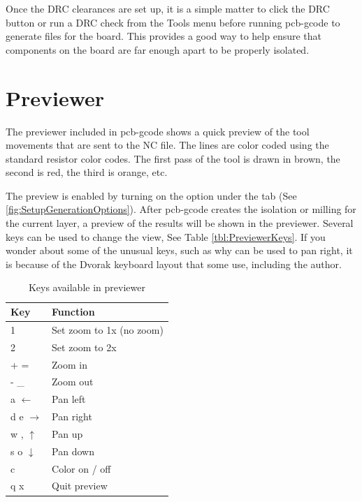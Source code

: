 \documentclass[11pt]{book}
\begin{document}
Once the DRC clearances are set up, it is a simple matter to click the DRC button or run a DRC check from the Tools menu before running pcb-gcode to generate files for the board. This provides a good way to help ensure that components on the board are far enough apart to be properly isolated.

%
%
\section{Previewer}\label{sec:Previewer}

The previewer included in pcb-gcode shows a quick preview of the tool movements that are sent to the NC file. The lines are color coded using the standard resistor color codes. The first pass of the tool is drawn in brown, the second is red, the third is orange, etc.

The preview is enabled by turning on the  option under the  tab (See \figurename \vref{fig:SetupGenerationOptions}). After pcb-gcode creates the isolation or milling for the current layer, a preview of the results will be shown in the previewer. Several keys can be used to change the view, See Table \vref{tbl:PreviewerKeys}. If you wonder about some of the unusual keys, such as why  can be used to pan right, it is because of the Dvorak keyboard layout that some use, including the author.

\begin{table}[h]\caption{Keys available in previewer}\label{tbl:PreviewerKeys}
\centering
\begin{tabular}{ll}
	\toprule
	Key 		& Function\\ 
	\midrule
	1		& Set zoom to 1x (no zoom)\\
	2		& Set zoom to 2x\\
	+ =		& Zoom in\\
	- \_{}		& Zoom out\\
	a $\leftarrow$ & Pan left\\
	d e $\rightarrow$ & Pan right\\
	w , $\uparrow$ & Pan up\\
	s o $\downarrow$ & Pan down\\
	c		& Color on / off\\
	q x		& Quit preview \\ \bottomrule
\end{tabular}
\end{table}
\end{document}
